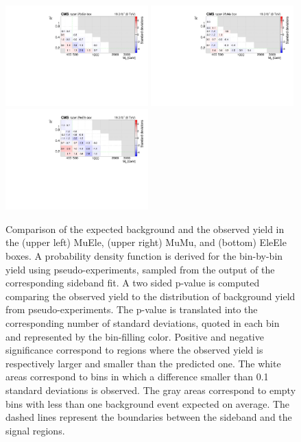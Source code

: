 \begin{figure}[tb!]
\centering
\includegraphics[width=0.49\textwidth]{figs/analysis8TeV/nSigmaLog_MuEle.pdf}
\includegraphics[width=0.49\textwidth]{figs/analysis8TeV/nSigmaLog_MuMu.pdf}
\includegraphics[width=0.49\textwidth]{figs/analysis8TeV/nSigmaLog_EleEle.pdf}
\caption{Comparison of the expected background and the observed yield
  in the (upper left) MuEle, (upper right) MuMu, and (bottom)
  EleEle boxes. A probability density function is derived for the
  bin-by-bin yield using pseudo-experiments, sampled from the output
  of the corresponding sideband fit. A two sided p-value is computed
  comparing the observed yield to the distribution of background yield
  from pseudo-experiments. The p-value is translated into the
  corresponding number of standard deviations, quoted in each bin and
  represented by the bin-filling color. Positive and negative
  significance correspond to regions where the observed yield is
  respectively larger and smaller than the predicted one. The white areas
  correspond to bins in which a difference smaller than 0.1 standard
  deviations is observed. The gray areas correspond to empty bins with
  less than one background event expected on average. The dashed lines
  represent the boundaries between the sideband and the signal
  regions.\label{fig:FrenchFlagDilep}}

\end{figure}

